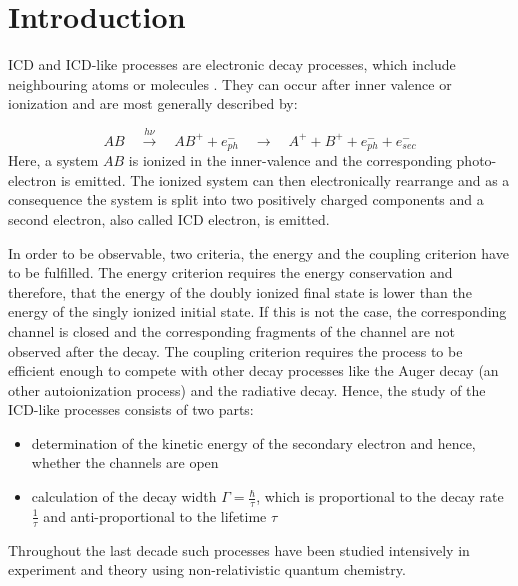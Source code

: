 \chapter{Introduction}
\ac{ICD} and \ac{ICD}-like processes are electronic decay processes,
which include neighbouring atoms or molecules \cite{Cederbaum97}.
They can occur after inner valence or ionization and
are most generally described by:

\begin{equation*}
 AB \quad \xrightarrow{h\nu}\quad AB^+ + e^-_{ph} \quad
    \rightarrow \quad A^+ + B^+ + e^-_{ph} + e^-_{sec}
\end{equation*}
Here, a system $AB$ is ionized in the inner-valence and the corresponding
photo-electron is emitted. The ionized system can then electronically
rearrange and as a consequence the system is split into two positively
charged components and a second electron, also called ICD electron, is
emitted.

In order to be observable, two criteria, the energy and the coupling criterion
have to be fulfilled. The energy criterion requires the energy conservation
and therefore, that the energy of the doubly ionized final state is lower than
the energy of the singly ionized initial state. If this is not the case, the
corresponding channel is closed and the corresponding fragments of the
channel are not observed after the decay.
The coupling criterion requires the process to be efficient enough to compete
with other decay processes like the Auger decay (an other autoionization
process) and the radiative decay.
Hence, the study of the \ac{ICD}-like processes consists of two parts:
\begin{itemize}
 \item determination of the kinetic energy of the secondary electron
       and hence, whether the channels are open
 \item calculation of the decay width $\Gamma=\frac{\hbar}{\tau}$, which
       is proportional to the decay rate $\frac{1}{\tau}$ and
       anti-proportional to the lifetime $\tau$
\end{itemize}

Throughout the last decade such processes have been studied intensively
in experiment \cite{}
and theory \cite{}
using non-relativistic quantum chemistry.

